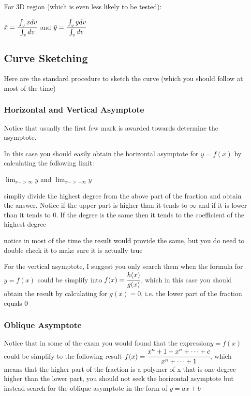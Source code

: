 \documentclass[]{article}
\begin{document}
For 3D region (which is even less likely to be tested):

\(\bar{x} = \cfrac{\int_v{x}dv}{\int_v dv}\) and
\(\bar{y} = \cfrac{\int_v{y}dv}{\int_v dv}\)

\subsection{Curve Sketching}\label{header-n1100}

Here are the standard procedure to sketch the curve (which you should
follow at most of the time)

\subsubsection{Horizontal and Vertical Asymptote}\label{header-n1103}

Notice that usually the first few mark is awarded towards determine the
asymptote.

In this case you should easily obtain the horizontal asymptote for
\(y = f(x)\) by calculating the following limit:

\(\lim_{x->\infty} y \) and \(\lim_{x-> - \infty} y \)

simpliy divide the highest degree from the above part of the fraction
and obtain the answer. Notice if the upper part is higher than it tends
to \(\infty\) and if it is lower than it tends to 0. If the degree is
the same then it tends to the coefficient of the highest degree

notice in most of the time the result would provide the same, but you do
need to double check it to make sure it is actually true

For the vertical asymptote, I suggest you only search them when the
formula for \(y = f(x)\) could be simplify into
\(f(x) = \cfrac{h(x)}{g(x)}\), which in this case you should obtain the
result by calculating for \(g(x) = 0\), i.e. the lower part of the
fraction equals 0

\subsubsection{Oblique Asymptote}\label{header-n1116}

Notice that in some of the exam you would found that the
expression\(y = f(x)\) could be simplify to the following result
\(f(x) = \cfrac{x^n+1 + x^n + \dots + c}{x^n + \dots + 1}\), which means
that the higher part of the fraction is a polymer of x that is one
degree higher than the lower part, you should not seek the horizontal
asymptote but instead search for the oblique asymptote in the form of
\(y = ax+b\)
\end{document}
